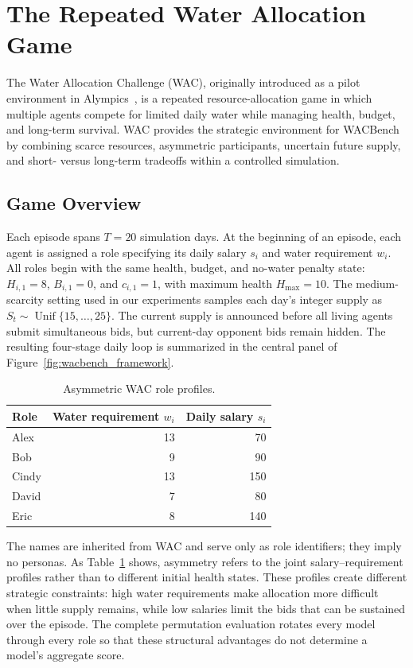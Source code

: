 \documentclass[letterpaper]{article} %
\begin{document}
\section{The Repeated Water Allocation Game}
The Water Allocation Challenge (WAC), originally introduced
as a pilot environment in Alympics~\cite{mao2025alympics},
is a repeated resource-allocation game in which multiple agents compete for
limited daily water while managing health, budget, and long-term survival.
WAC provides the strategic environment for WACBench by combining scarce
resources, asymmetric participants, uncertain future supply, and short- versus
long-term tradeoffs within a controlled simulation.

\subsection{Game Overview}

Each episode spans $T=20$ simulation days. At the beginning of an
episode, each agent is assigned a role specifying its daily salary $s_i$
and water requirement $w_i$. All roles begin with the same health,
budget, and no-water penalty state: $H_{i,1}=8$, $B_{i,1}=0$, and
$c_{i,1}=1$, with maximum health $H_{\max}=10$. The medium-scarcity
setting used in our experiments samples each day's integer supply as
$S_t\sim\operatorname{Unif}\{15,\ldots,25\}$. The current supply is
announced before all living agents submit simultaneous bids, but
current-day opponent bids remain hidden. The resulting four-stage daily loop
is summarized in the central panel of Figure~\ref{fig:wacbench_framework}.

\begin{table}[t]
    \centering
    \small
    \setlength{\tabcolsep}{9pt}
    \caption{Asymmetric WAC role profiles.}
    \label{tab:role-profiles}
    \begin{tabular}{lrr}
        \toprule
        Role & Water requirement $w_i$ & Daily salary $s_i$ \\
        \midrule
        Alex  & 13 & 70  \\
        Bob   & 9  & 90  \\
        Cindy & 13 & 150 \\
        David & 7  & 80  \\
        Eric  & 8  & 140 \\
        \bottomrule
    \end{tabular}
\end{table}

The names are inherited from WAC and serve only as role identifiers; they
imply no personas.
As Table~\ref{tab:role-profiles} shows, asymmetry refers to the joint
salary--requirement profiles rather than to different initial health
states. These profiles create different strategic constraints: high water
requirements make allocation more difficult when little supply remains,
while low salaries limit the bids that can be sustained over the episode.
The complete permutation evaluation rotates every model through every role
so that these structural advantages do not determine a model's aggregate
score.
\end{document}
